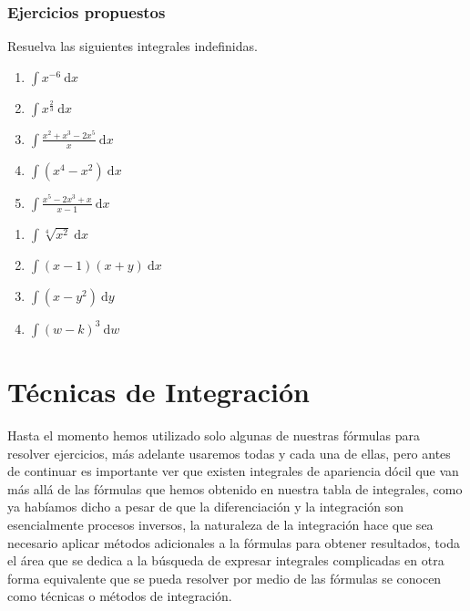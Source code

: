 \documentclass[11pt,letterpaper,oneside]{book}
\numberwithin{equation}{section}
\newcommand{\inti}[2]{\int #1 \text{d}#2}
\begin{document}
	\subsection{Ejercicios propuestos}
	
	\par Resuelva las siguientes integrales indefinidas.

	\begin{minipage}[t]{0.48\textwidth}
		\begin{enumerate}[series=Ej2]
			\item $\inti{x^{-6}\ }{x}$
			\item $\inti{x^{\frac{2}{3}}\ }{x}$
			\item $\inti{\frac{x^2+x^3-2x^5}{x}\ }{x}$
			\item $\inti{(x^4-x^2)\ }{x}$
			\item $\inti{\frac{x^5-2x^3+x}{x-1}\ }{x}$
		\end{enumerate}
	\end{minipage}
	\begin{minipage}[t]{0.48\textwidth}
		\begin{enumerate}[resume*=Ej2]
			\item $\inti{\sqrt[4]{x^2}\ }{x}$
			\item $\inti{(x-1)(x+y)\ }{x}$
			\item $\inti{(x-y^2)\ }{y} $
			\item $\inti{(w-k)^3\ }{w}$ 
		\end{enumerate}
	\end{minipage}
	\chapter{Técnicas de Integración}
	\par Hasta el momento hemos utilizado solo algunas de nuestras fórmulas para resolver ejercicios, más adelante usaremos todas y cada una de ellas, pero antes de continuar es importante ver que existen integrales de apariencia dócil que van más allá de las fórmulas que hemos obtenido en nuestra tabla de integrales, como ya habíamos dicho a pesar de que la diferenciación y la integración son esencialmente procesos inversos, la naturaleza de la integración hace que sea necesario aplicar métodos adicionales a la fórmulas para obtener resultados, toda el área que se dedica a la búsqueda de expresar integrales complicadas en otra forma equivalente que se pueda resolver por medio de las fórmulas se conocen como técnicas o métodos de integración.
	
\end{document}
